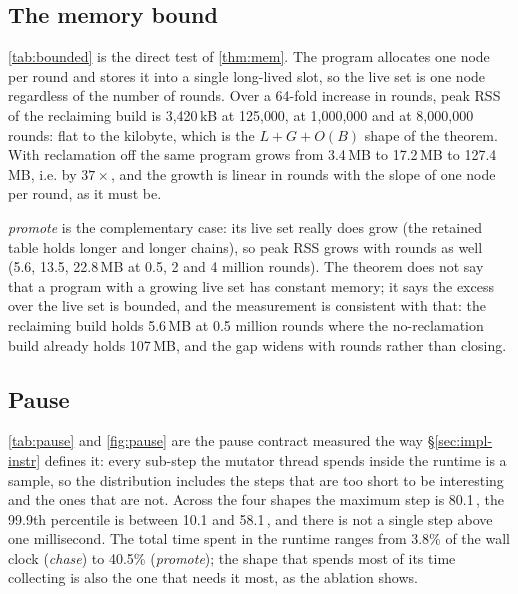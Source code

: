 \subsection{The memory bound}
\label{sec:eval-bounded}



\tab\ref{tab:bounded} is the direct test of \thm\ref{thm:mem}.  The program allocates one node
per round and stores it into a single long-lived slot, so the live set is one node regardless of
the number of rounds.  Over a 64-fold increase in rounds, peak RSS of the reclaiming build is
3{,}420\,kB at 125{,}000, at 1{,}000{,}000 and at 8{,}000{,}000 rounds: flat to the kilobyte,
which is the $L+G+O(B)$ shape of the theorem.  With reclamation off the same program grows from
3.4\,MB to 17.2\,MB to 127.4\,MB, i.e. by $37\times$, and the growth is linear in rounds with the
slope of one node per round, as it must be.

\emph{promote} is the complementary case: its live set really does grow (the retained table
holds longer and longer chains), so peak RSS grows with rounds as well (5.6, 13.5, 22.8\,MB at
0.5, 2 and 4 million rounds).  The theorem does not say that a program with a growing live set has
constant memory; it says the excess over the live set is bounded, and the measurement is
consistent with that: the reclaiming build holds 5.6\,MB at 0.5 million rounds where the
no-reclamation build already holds 107\,MB, and the gap widens with rounds rather than closing.

\subsection{Pause}
\label{sec:eval-pause}



\tab\ref{tab:pause} and \fig\ref{fig:pause} are the pause contract measured the way \S\ref{sec:impl-instr}
defines it: every sub-step the mutator thread spends inside the runtime is a sample, so the
distribution includes the steps that are too short to be interesting and the ones that are not.
Across the four shapes the maximum step is 80.1\,\us, the 99.9th percentile is between 10.1 and
58.1\,\us, and there is not a single step above one millisecond.  The total time spent in the
runtime ranges from 3.8\% of the wall clock (\emph{chase}) to 40.5\% (\emph{promote}); the
shape that spends most of its time collecting is also the one that needs it most, as the
ablation shows.


